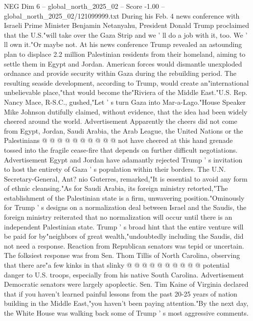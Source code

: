 \begin{textsample}{NEG Dim 6 – global\_north\_2025\_02 – Score -1.00 – global\_north\_2025\_02/121099999.txt}  \label{ex:f6_neg_108}
During his Feb. 4 news conference with Israeli Prime Minister Benjamin Netanyahu, President Donald Trump proclaimed that the U.S."will take over the Gaza Strip and we ' ll do a job with it, too.
We ' ll own it."Or maybe not.
At his news conference Trump revealed an astounding plan to displace 2.2 million Palestinian residents from their homeland, aiming to settle them in Egypt and Jordan.
American forces would dismantle unexploded ordnance and provide security within Gaza during the rebuilding period.
The resulting seaside development, according to Trump, would create an"international unbelievable place,"that would become the"Riviera of the Middle East."U.S.
Rep.
Nancy Mace, R-S.C., gushed,"Let ' s turn Gaza into Mar-a-Lago."House Speaker Mike Johnson dutifully claimed, without evidence, that the idea had been widely cheered around the world.
Advertisement Apparently the cheers did not come from Egypt, Jordan, Saudi Arabia, the Arab League, the United Nations or the Palestinians @ @ @ @ @ @ @ @ @ @ not have cheered at this hand grenade tossed into the fragile cease-fire that depends on further difficult negotiations.
Advertisement Egypt and Jordan have adamantly rejected Trump ' s invitation to host the entirety of Gaza ' s population within their borders.
The U.N.
Secretary-General, Ant? nio Guterres, remarked,"It is essential to avoid any form of ethnic cleansing."As for Saudi Arabia, its foreign ministry retorted,"The establishment of the Palestinian state is a firm, unwavering position."Ominously for Trump ' s designs on a normalization deal between Israel and the Saudis, the foreign ministry reiterated that no normalization will occur until there is an independent Palestinian state.
Trump ' s broad hint that the entire venture will be paid for by"neighbors of great wealth,"undoubtedly including the Saudis, did not need a response.
Reaction from Republican senators was tepid or uncertain.
The folksiest response was from Sen.
Thom Tillis of North Carolina, observing that there are"a few kinks in that slinky @ @ @ @ @ @ @ @ @ @ potential danger to U.S. troops, especially from his native South Carolina.
Advertisement Democratic senators were largely apoplectic.
Sen.
Tim Kaine of Virginia declared that if you haven't learned painful lessons from the past 20-25 years of nation building in the Middle East,"you haven't been paying attention."By the next day, the White House was walking back some of Trump ' s most aggressive comments.

\end{textsample}

